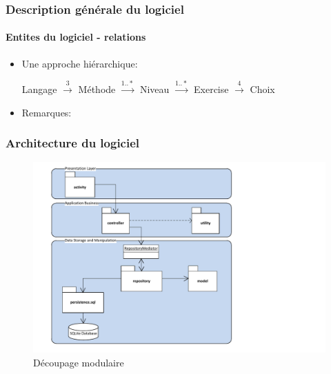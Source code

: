 \documentclass[15pt]{beamer}
\begin{document}
\begin{frame}
 \frametitle{Description g\'en\'erale du logiciel}
 \framesubtitle{Entites du logiciel - relations}
\begin{itemize}
  \item Une approche hi\'erarchique:
  \begin{center}
    Langage $\stackrel{3}{\longrightarrow}$ M\'ethode $\stackrel{1..*}{\longrightarrow}$ Niveau $\stackrel{1..*}{\longrightarrow}$ Exercise $\stackrel{4}{\longrightarrow}$ Choix
  \end{center}
  \item Remarques:
\end{itemize}
\end{frame}


\begin{frame}
 \frametitle{Architecture du logiciel}
\begin{figure}[tr]
  \centering
  \includegraphics[scale=0.50]{./components.pdf}
  \caption{D\'ecoupage modulaire}
  \label{fig:figure1}
\end{figure}
\end{frame}
\end{document}
